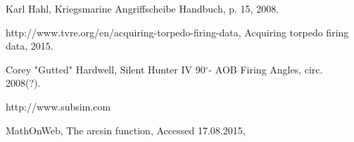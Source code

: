 \documentclass{article}
\newcommand{\degree}{$^{\circ}$}
\begin{document}



\pagebreak
\begin{thebibliography}{9}

  Karl Hahl,
  Kriegsmarine Angriffscheibe Handbuch,
  p. 15,
  2008.
  
http://www.tvre.org/en/acquiring-torpedo-firing-data,
Acquiring torpedo firing data,
2015.

Corey "Gutted" Hardwell,
Silent Hunter IV 90\degree - AOB Firing Angles,
circ. 2008(?).

http://www.subsim.com

MathOnWeb,
The arcsin function,
Accessed 17.08.2015,


\end{thebibliography}
\end{document}
